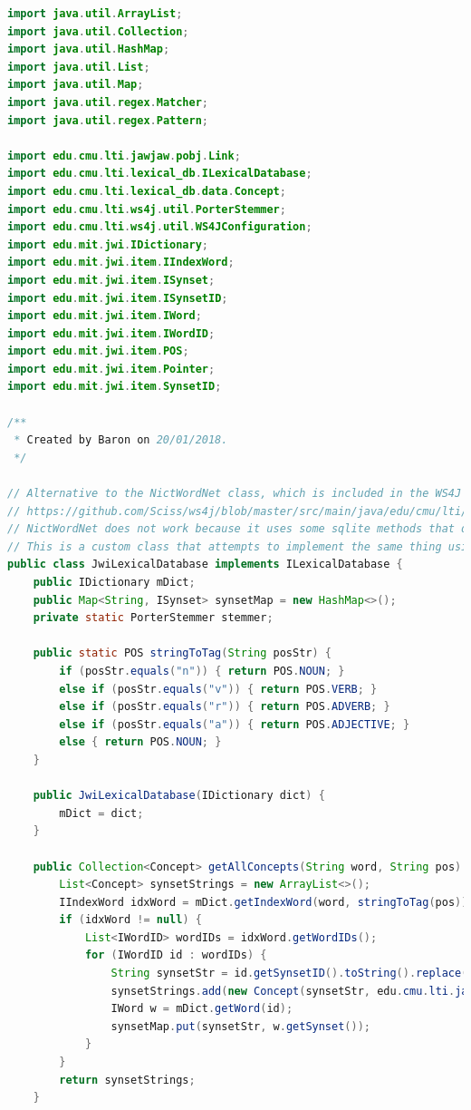 \documentclass[12pt]{article}
\begin{document}
\begin{lstlisting}[language=Java]
import java.util.ArrayList;
import java.util.Collection;
import java.util.HashMap;
import java.util.List;
import java.util.Map;
import java.util.regex.Matcher;
import java.util.regex.Pattern;

import edu.cmu.lti.jawjaw.pobj.Link;
import edu.cmu.lti.lexical_db.ILexicalDatabase;
import edu.cmu.lti.lexical_db.data.Concept;
import edu.cmu.lti.ws4j.util.PorterStemmer;
import edu.cmu.lti.ws4j.util.WS4JConfiguration;
import edu.mit.jwi.IDictionary;
import edu.mit.jwi.item.IIndexWord;
import edu.mit.jwi.item.ISynset;
import edu.mit.jwi.item.ISynsetID;
import edu.mit.jwi.item.IWord;
import edu.mit.jwi.item.IWordID;
import edu.mit.jwi.item.POS;
import edu.mit.jwi.item.Pointer;
import edu.mit.jwi.item.SynsetID;

/**
 * Created by Baron on 20/01/2018.
 */

// Alternative to the NictWordNet class, which is included in the WS4J library.
// https://github.com/Sciss/ws4j/blob/master/src/main/java/edu/cmu/lti/lexical_db/NictWordNet.java
// NictWordNet does not work because it uses some sqlite methods that do not work in Android.
// This is a custom class that attempts to implement the same thing using MIT's JWI library.
public class JwiLexicalDatabase implements ILexicalDatabase {
    public IDictionary mDict;
    public Map<String, ISynset> synsetMap = new HashMap<>();
    private static PorterStemmer stemmer;

    public static POS stringToTag(String posStr) {
        if (posStr.equals("n")) { return POS.NOUN; }
        else if (posStr.equals("v")) { return POS.VERB; }
        else if (posStr.equals("r")) { return POS.ADVERB; }
        else if (posStr.equals("a")) { return POS.ADJECTIVE; }
        else { return POS.NOUN; }
    }

    public JwiLexicalDatabase(IDictionary dict) {
        mDict = dict;
    }

    public Collection<Concept> getAllConcepts(String word, String pos) {
        List<Concept> synsetStrings = new ArrayList<>();
        IIndexWord idxWord = mDict.getIndexWord(word, stringToTag(pos));
        if (idxWord != null) {
            List<IWordID> wordIDs = idxWord.getWordIDs();
            for (IWordID id : wordIDs) {
                String synsetStr = id.getSynsetID().toString().replace("SID-", "").toLowerCase();
                synsetStrings.add(new Concept(synsetStr, edu.cmu.lti.jawjaw.pobj.POS.valueOf(pos)));
                IWord w = mDict.getWord(id);
                synsetMap.put(synsetStr, w.getSynset());
            }
        }
        return synsetStrings;
    }


\end{lstlisting}
\end{document}
